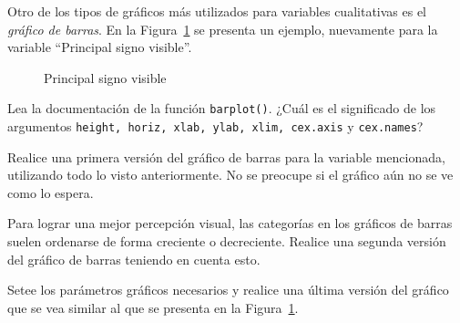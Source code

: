 \documentclass{../prob}
\begin{document}
	\begin{problema}
	Otro de los tipos de gráficos más utilizados para variables cualitativas es el \textit{gráfico de barras}. En la Figura~\ref{fig:plot02} se presenta un ejemplo, nuevamente para la variable \textquotedblleft Principal signo visible\textquotedblright.\\
	
\begin{figure}[!ht]
    \centering
    
    \caption{Principal signo visible}
    \label{fig:plot02}
\end{figure}	
	
	\begin{parte}
		Lea la documentación de la función \texttt{barplot()}. ¿Cuál es el significado de los argumentos \texttt{height, horiz, xlab, ylab, xlim, cex.axis} y \texttt{cex.names}?
	\end{parte}	
	
	\begin{parte}
	Realice una primera versión del gráfico de barras para la variable mencionada, utilizando todo lo visto anteriormente. No se preocupe si el gráfico aún no se ve como lo espera.	
	\end{parte}
	
	\begin{parte}
	Para lograr una mejor percepción visual, las categorías en los gráficos de barras suelen ordenarse de forma creciente o decreciente. Realice una segunda versión del gráfico de barras teniendo en cuenta esto. \\
	
	\noindent{}	
	\end{parte}
	
	\begin{parte}
	Setee los parámetros gráficos necesarios y realice una última versión del gráfico que se vea similar al que se presenta en la Figura~\ref{fig:plot02}.
	\end{parte}	
	\end{problema}
	
\end{document}
